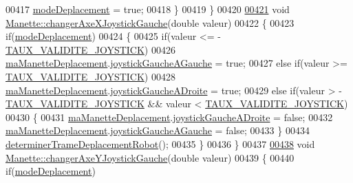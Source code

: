 \begin{DoxyCode}
00417         \hyperlink{class_manette_a4dc6231c8cc65fac03f59d323fa9a038}{modeDeplacement} = \textcolor{keyword}{true};
00418     \}
00419 \}
00420 
\hyperlink{class_manette_a82a0d2535dd1dd9ea4021aa1fe71b1bc}{00421} \textcolor{keywordtype}{void} \hyperlink{class_manette_a82a0d2535dd1dd9ea4021aa1fe71b1bc}{Manette::changerAxeXJoystickGauche}(\textcolor{keywordtype}{double} valeur)
00422 \{
00423     \textcolor{keywordflow}{if}(\hyperlink{class_manette_a4dc6231c8cc65fac03f59d323fa9a038}{modeDeplacement})
00424     \{
00425         \textcolor{keywordflow}{if}(valeur <= -\hyperlink{manette_8h_a1ae244fc787303cd46a9b684fb4b4056}{TAUX\_VALIDITE\_JOYSTICK})
00426             \hyperlink{class_manette_af3d0f304c4c33e02bdf34fc99aa4dbff}{maManetteDeplacement}.\hyperlink{struct_etat_manette_deplacement_af7e92a8d8f116e2bc4a5a95386f604e7}{joystickGaucheAGauche} = \textcolor{keyword}{true};
00427         \textcolor{keywordflow}{else} \textcolor{keywordflow}{if}(valeur >= \hyperlink{manette_8h_a1ae244fc787303cd46a9b684fb4b4056}{TAUX\_VALIDITE\_JOYSTICK})
00428             \hyperlink{class_manette_af3d0f304c4c33e02bdf34fc99aa4dbff}{maManetteDeplacement}.\hyperlink{struct_etat_manette_deplacement_a8fa93da5af430ac00ffd4ee8b76987a2}{joystickGaucheADroite} = \textcolor{keyword}{true};
00429         \textcolor{keywordflow}{else} \textcolor{keywordflow}{if}(valeur > -\hyperlink{manette_8h_a1ae244fc787303cd46a9b684fb4b4056}{TAUX\_VALIDITE\_JOYSTICK} && valeur < 
      \hyperlink{manette_8h_a1ae244fc787303cd46a9b684fb4b4056}{TAUX\_VALIDITE\_JOYSTICK})
00430         \{
00431             \hyperlink{class_manette_af3d0f304c4c33e02bdf34fc99aa4dbff}{maManetteDeplacement}.\hyperlink{struct_etat_manette_deplacement_a8fa93da5af430ac00ffd4ee8b76987a2}{joystickGaucheADroite} = \textcolor{keyword}{false};
00432             \hyperlink{class_manette_af3d0f304c4c33e02bdf34fc99aa4dbff}{maManetteDeplacement}.\hyperlink{struct_etat_manette_deplacement_af7e92a8d8f116e2bc4a5a95386f604e7}{joystickGaucheAGauche} = \textcolor{keyword}{false};
00433         \}
00434         \hyperlink{class_manette_a97a50caac68954a229c7e9461e7f4232}{determinerTrameDeplacementRobot}();
00435     \}
00436 \}
00437 
\hyperlink{class_manette_a6fd30466571a96d9789c54c8e8104ab2}{00438} \textcolor{keywordtype}{void} \hyperlink{class_manette_a6fd30466571a96d9789c54c8e8104ab2}{Manette::changerAxeYJoystickGauche}(\textcolor{keywordtype}{double} valeur)
00439 \{
00440     \textcolor{keywordflow}{if}(\hyperlink{class_manette_a4dc6231c8cc65fac03f59d323fa9a038}{modeDeplacement})

\end{DoxyCode}
